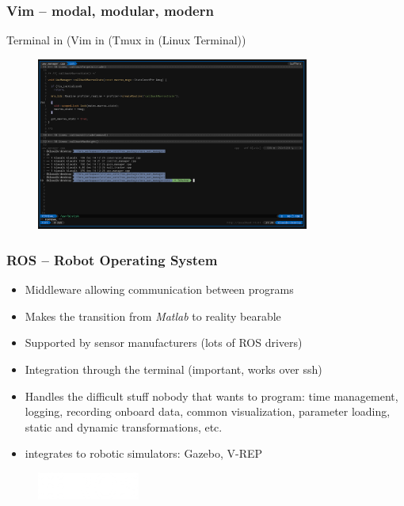 \documentclass[aspectratio=1610]{beamer}
\begin{document}


\begin{frame}
  \frametitle{Vim -- modal, modular, modern}

  \begin{block}{Terminal in (Vim in (Tmux in (Linux Terminal))}
    \begin{figure}
      \includegraphics[width=0.8\textwidth]{./fig/terminal_in_vim.png}
    \end{figure}
  \end{block}

\end{frame}



\begin{frame}
  \frametitle{ROS -- Robot Operating System}

  \begin{itemize}
    \item Middleware allowing communication between programs
    \item Makes the transition from \emph{Matlab} to reality bearable
    \item Supported by sensor manufacturers (lots of ROS drivers)
    \item Integration through the terminal (important, works over ssh)
    \item Handles the difficult stuff nobody that wants to program: time management, logging, recording onboard data, common visualization, parameter loading, static and dynamic transformations, etc.
    \item integrates to robotic simulators: Gazebo, V-REP
  \end{itemize}

  \begin{figure}
    \includegraphics[width=0.3\textwidth]{./fig/ros_logo.png}
  \end{figure}

\end{frame}
\end{document}
